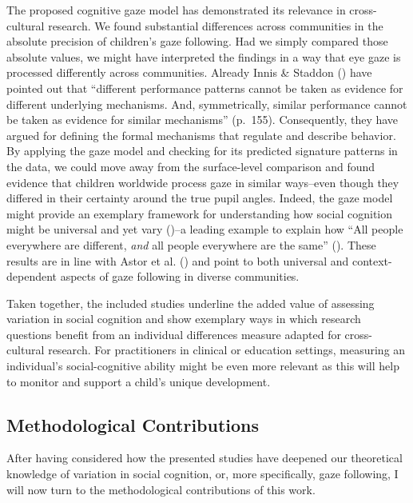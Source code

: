 \documentclass[
]{scrbook}
\begin{document}
The proposed cognitive gaze model has demonstrated its relevance in cross-cultural research. We found substantial differences across communities in the absolute precision of children's gaze following. Had we simply compared those absolute values, we might have interpreted the findings in a way that eye gaze is processed differently across communities. Already Innis \& Staddon () have pointed out that ``different performance patterns cannot be taken as evidence for different underlying mechanisms. And, symmetrically, similar performance cannot be taken as evidence for similar mechanisms'' (p.~155). Consequently, they have argued for defining the formal mechanisms that regulate and describe behavior. By applying the gaze model and checking for its predicted signature patterns in the data, we could move away from the surface-level comparison and found evidence that children worldwide process gaze in similar ways\thinspace --\thinspace even though they differed in their certainty around the true pupil angles. Indeed, the gaze model might provide an exemplary framework for understanding how social cognition might be universal and yet vary ()\thinspace --\thinspace a leading example to explain how ``All people everywhere are different, \emph{and} all people everywhere are the same'' (). These results are in line with Astor et al. () and point to both universal and context-dependent aspects of gaze following in diverse communities.

Taken together, the included studies underline the added value of assessing variation in social cognition and show exemplary ways in which research questions benefit from an individual differences measure adapted for cross-cultural research. For practitioners in clinical or education settings, measuring an individual's social-cognitive ability might be even more relevant as this will help to monitor and support a child's unique development. \newpage

\subsection{Methodological Contributions}\label{contributions-methods}

After having considered how the presented studies have deepened our theoretical knowledge of variation in social cognition, or, more specifically, gaze following, I will now turn to the methodological contributions of this work.
\end{document}
